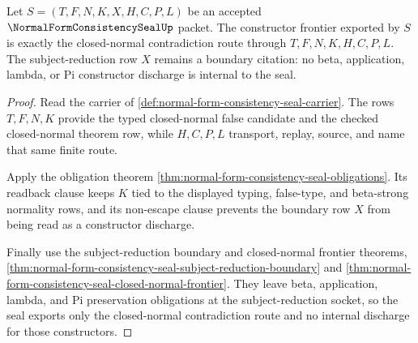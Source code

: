 \begin{theorem}
\label{thm:normalformconsistencyseal-constructor-frontier}
Let $S=(T,F,N,K,X,H,C,P,L)$ be an accepted
$\NormalFormConsistencySealUp$ packet. The constructor frontier exported by
$S$ is exactly the closed-normal contradiction route through
$T,F,N,K,H,C,P,L$. The subject-reduction row $X$ remains a boundary citation:
no beta, application, lambda, or Pi constructor discharge is internal to the
seal.
\end{theorem}
\begin{proof}
Read the carrier of
\autoref{def:normal-form-consistency-seal-carrier}. The rows $T,F,N,K$
provide the typed closed-normal false candidate and the checked
closed-normal theorem row, while $H,C,P,L$ transport, replay, source, and
name that same finite route.

Apply the obligation theorem
\autoref{thm:normal-form-consistency-seal-obligations}. Its readback clause
keeps $K$ tied to the displayed typing, false-type, and beta-strong normality
rows, and its non-escape clause prevents the boundary row $X$ from being read
as a constructor discharge.

Finally use the subject-reduction boundary and closed-normal frontier
theorems, \autoref{thm:normal-form-consistency-seal-subject-reduction-boundary}
and \autoref{thm:normal-form-consistency-seal-closed-normal-frontier}. They
leave beta, application, lambda, and Pi preservation obligations at the
subject-reduction socket, so the seal exports only the closed-normal
contradiction route and no internal discharge for those constructors.
\end{proof}

